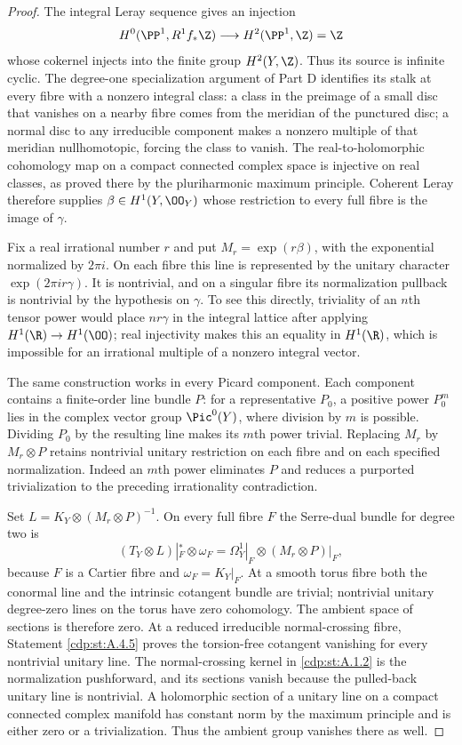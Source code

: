 \begin{proof}
The integral Leray sequence gives an injection
\[
H^0(\PP^1,R^1f_*\Z)\longrightarrow H^2(\PP^1,\Z)=\Z
\]
whose cokernel injects into the finite group $H^2(Y,\Z)$. Thus its source is infinite cyclic. The degree-one specialization argument of Part D identifies its stalk at every fibre with a nonzero integral class: a class in the preimage of a small disc that vanishes on a nearby fibre comes from the meridian of the punctured disc; a normal disc to any irreducible component makes a nonzero multiple of that meridian nullhomotopic, forcing the class to vanish. The real-to-holomorphic cohomology map on a compact connected complex space is injective on real classes, as proved there by the pluriharmonic maximum principle. Coherent Leray therefore supplies $\beta\in H^1(Y,\OO_Y)$ whose restriction to every full fibre is the image of $\gamma$.

Fix a real irrational number $r$ and put $M_r=\exp(r\beta)$, with the exponential normalized by $2\pi i$. On each fibre this line is represented by the unitary character $\exp(2\pi ir\gamma)$. It is nontrivial, and on a singular fibre its normalization pullback is nontrivial by the hypothesis on $\gamma$. To see this directly, triviality of an $n$th tensor power would place $nr\gamma$ in the integral lattice after applying $H^1(\R)\to H^1(\OO)$; real injectivity makes this an equality in $H^1(\R)$, which is impossible for an irrational multiple of a nonzero integral vector.

The same construction works in every Picard component. Each component contains a finite-order line bundle $P$: for a representative $P_0$, a positive power $P_0^m$ lies in the complex vector group $\Pic^0(Y)$, where division by $m$ is possible. Dividing $P_0$ by the resulting line makes its $m$th power trivial. Replacing $M_r$ by $M_r\otimes P$ retains nontrivial unitary restriction on each fibre and on each specified normalization. Indeed an $m$th power eliminates $P$ and reduces a purported trivialization to the preceding irrationality contradiction.

Set $L=K_Y\otimes(M_r\otimes P)^{-1}$. On every full fibre $F$ the Serre-dual bundle for degree two is
\[
 (T_Y\otimes L)|_F^*\otimes\omega_F
       =\Omega_Y^1|_F\otimes(M_r\otimes P)|_F,
\]
because $F$ is a Cartier fibre and $\omega_F=K_Y|_F$. At a smooth torus fibre both the conormal line and the intrinsic cotangent bundle are trivial; nontrivial unitary degree-zero lines on the torus have zero cohomology. The ambient space of sections is therefore zero. At a reduced irreducible normal-crossing fibre, Statement \ref{cdp:st:A.4.5} proves the torsion-free cotangent vanishing for every nontrivial unitary line. The normal-crossing kernel in \ref{cdp:st:A.1.2} is the normalization pushforward, and its sections vanish because the pulled-back unitary line is nontrivial. A holomorphic section of a unitary line on a compact connected complex manifold has constant norm by the maximum principle and is either zero or a trivialization. Thus the ambient group vanishes there as well.


\end{proof}
